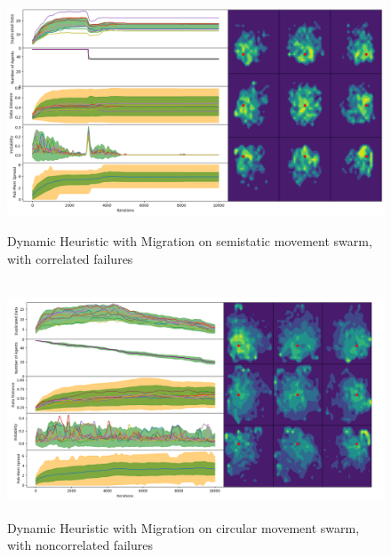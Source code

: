 \documentclass{UoYCSproject}
\begin{document}
\begin{figure}[htb]
\label{fig:static_movement_con3}
\begin{center}
\centering
\includegraphics[height=7cm]{"./Dynamic_Migration/Static_Move_con.png"}
\caption{Dynamic Heuristic with Migration on semi\-static movement swarm, with correlated failures}
\end{center}
\end{figure}

\begin{figure}[htb]
\label{fig:circle_movement_non3}
\begin{center}
\centering
\includegraphics[height=7cm]{"./Dynamic_Migration/Circle_Move_non2.png"}
\caption{Dynamic Heuristic with Migration on circular movement swarm, with non\-correlated failures}
\end{center}
\end{figure}
\end{document}

